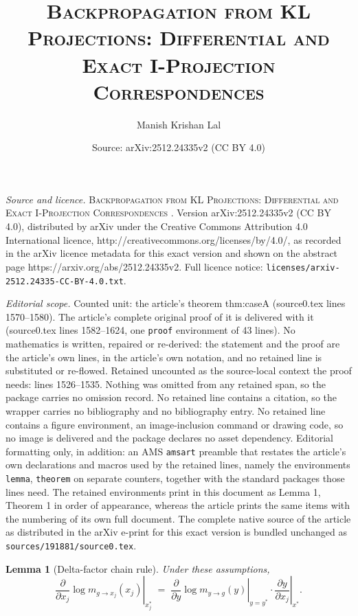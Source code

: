 \documentclass[10pt,a4paper]{amsart}
\title{\textsc{ Backpropagation from KL Projections: Differential and Exact I-Projection Correspondences }}
\author{Manish Krishan Lal}
\date{Source: arXiv:2512.24335v2 (CC BY 4.0)}
\newtheorem{lemma}{Lemma}
\begin{document}
\maketitle

\noindent\emph{Source and licence.} \textsc{ Backpropagation from KL Projections: Differential and Exact I-Projection Correspondences }. Version arXiv:2512.24335v2 (CC BY 4.0), distributed by arXiv under the Creative Commons Attribution 4.0 International licence, http://creativecommons.org/licenses/by/4.0/, as recorded in the arXiv licence metadata for this exact version and shown on the abstract page https://arxiv.org/abs/2512.24335v2. Full licence notice: \texttt{licenses/arxiv-2512.24335-CC-BY-4.0.txt}.\par\smallskip

\noindent\textit{Editorial scope.} Counted unit: the article's theorem thm:caseA (source0.tex lines 1570--1580). The article's complete original proof of it is delivered with it (source0.tex lines 1582--1624, one \texttt{proof} environment of 43 lines). No mathematics is written, repaired or re-derived: the statement and the proof are the article's own lines, in the article's own notation, and no retained line is substituted or re-flowed.  Retained uncounted as the source-local context the proof needs: lines 1526--1535.  Nothing was omitted from any retained span, so the package carries no omission record.  No retained line contains a citation, so the wrapper carries no bibliography and no bibliography entry.  No retained line contains a figure environment, an image-inclusion command or drawing code, so no image is delivered and the package declares no asset dependency.  Editorial formatting only, in addition: an AMS \texttt{amsart} preamble that restates the article's own declarations and macros used by the retained lines, namely the environments \texttt{lemma}, \texttt{theorem} on separate counters, together with the standard packages those lines need.  The retained environments print in this document as Lemma 1, Theorem 1 in order of appearance, whereas the article prints the same items with the numbering of its own full document.  The complete native source of the article as distributed in the arXiv e-print for this exact version is bundled unchanged as \texttt{sources/191881/source0.tex}.
\begin{lemma}[Delta-factor chain rule]
\label{lem:delta-chain}
Under these assumptions,
\[
\left.\frac{\partial}{\partial x_j}\log m_{g\to x_j}(x_j)\right|_{x_j^*}
\;=\;
\left.\frac{\partial}{\partial y}\log m_{y\to g}(y)\right|_{y=y^*}\cdot
\left.\frac{\partial y}{\partial x_j}\right|_{x^*}.
\]
\end{lemma}
\end{document}
